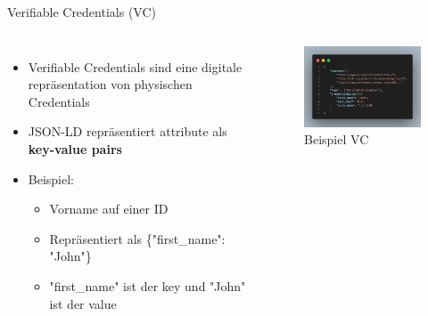 \documentclass[
	german,%
	authorontitle=true,
	]{bfhbeamer}
\begin{document}
\begin{frame}{Verifiable Credentials (VC)}
    \begin{columns}[onlytextwidth,T]
        \column{70mm}  

    \begin{itemize}
        \item Verifiable Credentials sind eine digitale repräsentation von physischen Credentials
        \item JSON-LD repräsentiert attribute als \textbf{key-value pairs}
        \item Beispiel:
        \begin{itemize}
            \item Vorname auf einer ID
            \item Repräsentiert als \{"first\_name": "John"\}
            \item "first\_name" ist der key und "John" ist der value
        \end{itemize}
    \end{itemize}

    \column{70mm}
    \begin{figure}
        \centering
        \includegraphics[width=70mm]{../img/VCexp.png}
        \caption{Beispiel VC}
    \end{figure}

    \end{columns}
\end{frame}
\end{document}

